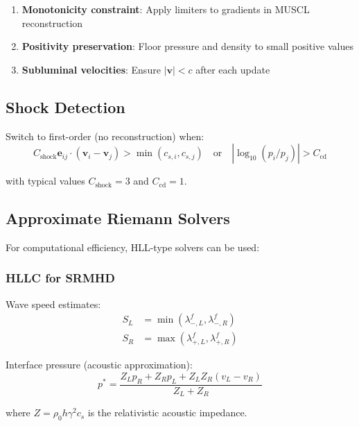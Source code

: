 \documentclass[12pt,a4paper]{article}
\begin{document}
\begin{enumerate}
    \item \textbf{Monotonicity constraint}: Apply limiters to gradients in MUSCL reconstruction
    \item \textbf{Positivity preservation}: Floor pressure and density to small positive values
    \item \textbf{Subluminal velocities}: Ensure $|\bm{v}| < c$ after each update
\end{enumerate}

\subsection{Shock Detection}

Switch to first-order (no reconstruction) when:
\begin{equation}
C_\text{shock} \bm{e}_{ij} \cdot (\bm{v}_i - \bm{v}_j) > \min(c_{s,i}, c_{s,j})
\quad \text{or} \quad
\left|\log_{10}(p_i/p_j)\right| > C_\text{cd}
\label{eq:shock_detection}
\end{equation}

with typical values $C_\text{shock} = 3$ and $C_\text{cd} = 1$.

\subsection{Approximate Riemann Solvers}

For computational efficiency, HLL-type solvers can be used:

\subsubsection{HLLC for SRMHD}

Wave speed estimates:
\begin{align}
S_L &= \min(\lambda_{-,L}^f, \lambda_{-,R}^f) \\
S_R &= \max(\lambda_{+,L}^f, \lambda_{+,R}^f)
\end{align}

Interface pressure (acoustic approximation):
\begin{equation}
p^* = \frac{Z_L p_R + Z_R p_L + Z_L Z_R (v_L - v_R)}{Z_L + Z_R}
\label{eq:hllc_pressure}
\end{equation}

where $Z = \rho_0 h \gamma^2 c_s$ is the relativistic acoustic impedance.

\end{document}

